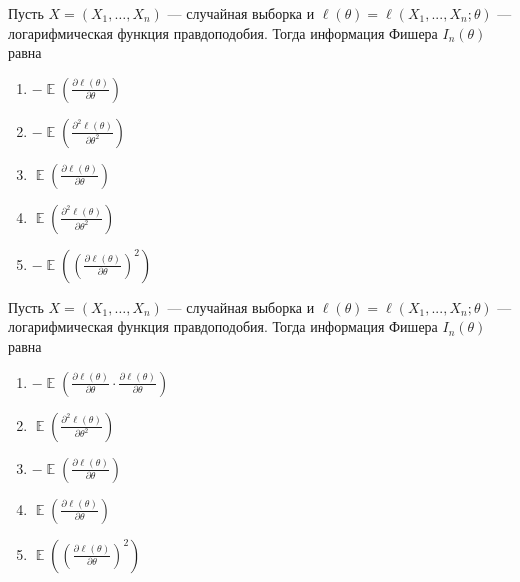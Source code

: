 \documentclass[t]{beamer}
\DeclareMathOperator{\E}{\mathbb{E}}
\begin{document}
 \begin{frame} \label{50} 
\begin{block}{50} 

Пусть $X = (X_1, \ldots , X_n)$ — случайная выборка и $\ell(\theta) = \ell(X_1, ... , X_n; \theta)$ — логарифмическая функция правдоподобия. Тогда информация Фишера $I_n(\theta)$ равна
  


 \end{block} 
\begin{enumerate} 
\item[] \hyperlink{50-No}{\beamergotobutton{} $-\E \left( \frac{\partial \ell (\theta)}{\partial \theta} \right)$}
\item[] \hyperlink{50-Yes}{\beamergotobutton{} $-\E \left( \frac{\partial^2 \ell (\theta)}{\partial \theta^2} \right)$}
\item[] \hyperlink{50-No}{\beamergotobutton{} $\E \left( \frac{\partial \ell (\theta)}{\partial \theta} \right)$}
\item[] \hyperlink{50-No}{\beamergotobutton{} $\E \left( \frac{\partial^2 \ell (\theta)}{\partial \theta^2} \right)$}
\item[] \hyperlink{50-No}{\beamergotobutton{} $-\E \left( \left( \frac{\partial \ell (\theta)}{\partial \theta} \right) ^2 \right)$}
\end{enumerate} 
\end{frame} 


 \begin{frame} \label{51} 
\begin{block}{51} 

Пусть $X = (X_1, \ldots , X_n)$ — случайная выборка и $\ell(\theta) = \ell(X_1, ... , X_n; \theta)$ — логарифмическая функция правдоподобия. Тогда информация Фишера $I_n(\theta)$ равна
  


 \end{block} 
\begin{enumerate} 
\item[] \hyperlink{51-No}{\beamergotobutton{} $- \E \left( \frac{\partial \ell (\theta)}{\partial \theta} \cdot \frac{\partial \ell (\theta)}{\partial \theta} \right)$}
\item[] \hyperlink{51-No}{\beamergotobutton{} $ \E \left( \frac{\partial^2 \ell (\theta)}{\partial \theta^2} \right)$}
\item[] \hyperlink{51-No}{\beamergotobutton{} $- \E \left( \frac{\partial \ell (\theta)}{\partial \theta} \right)$}
\item[] \hyperlink{51-No}{\beamergotobutton{} $\E \left( \frac{\partial \ell (\theta)}{\partial \theta} \right)$}
\item[] \hyperlink{51-Yes}{\beamergotobutton{} $\E \left( \left( \frac{\partial \ell (\theta)}{\partial \theta} \right) ^2 \right)$}
\end{enumerate} 
\end{frame} 
\end{document}
